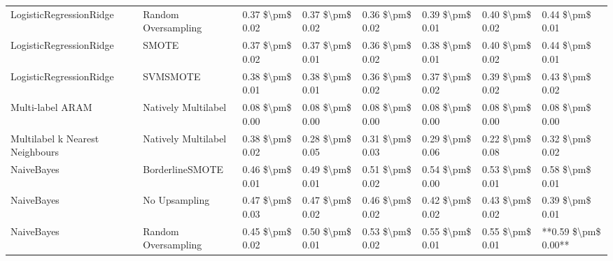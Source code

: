 \begin{tabular}{llllllll}
        LogisticRegressionRidge &           Random Oversampling & 0.37 \$\textbackslash pm\$ 0.02 &           0.37 \$\textbackslash pm\$ 0.02 &       0.36 \$\textbackslash pm\$ 0.02 &        0.39 \$\textbackslash pm\$ 0.01 &                         0.40 \$\textbackslash pm\$ 0.02 &     0.44 \$\textbackslash pm\$ 0.01 \\
        LogisticRegressionRidge &                         SMOTE & 0.37 \$\textbackslash pm\$ 0.02 &           0.37 \$\textbackslash pm\$ 0.01 &       0.36 \$\textbackslash pm\$ 0.02 &        0.38 \$\textbackslash pm\$ 0.01 &                         0.40 \$\textbackslash pm\$ 0.02 &     0.44 \$\textbackslash pm\$ 0.01 \\
        LogisticRegressionRidge &                      SVMSMOTE & 0.38 \$\textbackslash pm\$ 0.01 &           0.38 \$\textbackslash pm\$ 0.01 &       0.36 \$\textbackslash pm\$ 0.02 &        0.37 \$\textbackslash pm\$ 0.02 &                         0.39 \$\textbackslash pm\$ 0.02 &     0.43 \$\textbackslash pm\$ 0.02 \\
               Multi-label ARAM &           Natively Multilabel & 0.08 \$\textbackslash pm\$ 0.00 &           0.08 \$\textbackslash pm\$ 0.00 &       0.08 \$\textbackslash pm\$ 0.00 &        0.08 \$\textbackslash pm\$ 0.00 &                         0.08 \$\textbackslash pm\$ 0.00 &     0.08 \$\textbackslash pm\$ 0.00 \\
Multilabel k Nearest Neighbours &           Natively Multilabel & 0.38 \$\textbackslash pm\$ 0.02 &           0.28 \$\textbackslash pm\$ 0.05 &       0.31 \$\textbackslash pm\$ 0.03 &        0.29 \$\textbackslash pm\$ 0.06 &                         0.22 \$\textbackslash pm\$ 0.08 &     0.32 \$\textbackslash pm\$ 0.02 \\
                     NaiveBayes &               BorderlineSMOTE & 0.46 \$\textbackslash pm\$ 0.01 &           0.49 \$\textbackslash pm\$ 0.01 &       0.51 \$\textbackslash pm\$ 0.02 &        0.54 \$\textbackslash pm\$ 0.00 &                         0.53 \$\textbackslash pm\$ 0.01 &     0.58 \$\textbackslash pm\$ 0.01 \\
                     NaiveBayes &                 No Upsampling & 0.47 \$\textbackslash pm\$ 0.03 &           0.47 \$\textbackslash pm\$ 0.02 &       0.46 \$\textbackslash pm\$ 0.02 &        0.42 \$\textbackslash pm\$ 0.02 &                         0.43 \$\textbackslash pm\$ 0.02 &     0.39 \$\textbackslash pm\$ 0.01 \\
                     NaiveBayes &           Random Oversampling & 0.45 \$\textbackslash pm\$ 0.02 &           0.50 \$\textbackslash pm\$ 0.01 &       0.53 \$\textbackslash pm\$ 0.02 &        0.55 \$\textbackslash pm\$ 0.01 &                         0.55 \$\textbackslash pm\$ 0.01 & **0.59 \$\textbackslash pm\$ 0.00** \\

\end{tabular}

